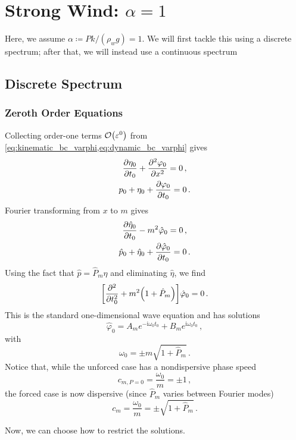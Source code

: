 \documentclass{jfm}
\let\Oldsection\section
\renewcommand{\section}{\FloatBarrier\Oldsection}
\let\Oldsubsection\subsection
\renewcommand{\subsection}{\FloatBarrier\Oldsubsection}
\let\Oldsubsubsection\subsubsection
\renewcommand{\subsubsection}{\FloatBarrier\Oldsubsubsection}
\newcommand{\GenP}{\hat{P}_m}
\newcommand{\im}{\mathrm{i}}
\renewcommand*{\epsilon}{\varepsilon}
\begin{document}
\section{\texorpdfstring{Strong Wind: $\alpha = 1$}{Strong Wind}}
Here, we assume $\alpha \coloneqq P k/(\rho_w g) = 1$.
We will first tackle this using a discrete spectrum; after that, we will
instead use a continuous spectrum

\subsection{Discrete Spectrum}

\subsubsection{Zeroth Order Equations}
Collecting order-one terms $\order{\epsilon^0}$ from
\cref{eq:kinematic_bc_varphi,eq:dynamic_bc_varphi} gives
\begin{gather}
  \pdv{\eta_0}{t_0} + \pdv[2]{\varphi_0}{x} = 0 \,,
  \label{eq:zero_order_kin} \\
  p_0 + \eta_0 + \pdv{\varphi_0}{t_0} = 0 \,.
  \label{eq:zero_order_dyn}
\end{gather}
Fourier transforming from $x$ to $m$ gives
\begin{gather}
  \pdv{\hat{\eta}_0}{t_0} - m^2  \hat{\varphi}_0 = 0 \,, \\
  \hat{p}_0 + \hat{\eta}_0 + \pdv{\hat{\varphi}_0}{t_0} = 0 \,.
\end{gather}
Using the fact that $\hat{p} = \GenP \hat{\eta}$ and eliminating
$\hat{\eta}$, we find
\begin{equation}
  \bqty{\pdv[2]{t_0} + m^2 \pqty{1+\GenP}} \hat{\varphi}_0 = 0 \,.
\end{equation}
This is the standard one-dimensional wave equation and has solutions
\begin{equation}
  \hat{\varphi}_0 = A_m e^{-\im \omega_0 t_0} + B_m e^{\im \omega_0 t_0}
    \,,
\end{equation}
with
\begin{equation}
  \omega_0 = \pm m \sqrt{1 + \GenP} \,.
\end{equation}
Notice that, while the unforced case has a nondispersive phase speed
\[
  c_{m, P=0} = \frac{\omega_0}{m} = \pm 1 \,,
\]
the forced case is now dispersive (since $\GenP$ varies between Fourier
modes)
\[
  c_m = \frac{\omega_0}{m} = \pm \sqrt{1 + \GenP} \,.
\]

Now, we can choose how to restrict the solutions.
\end{document}
